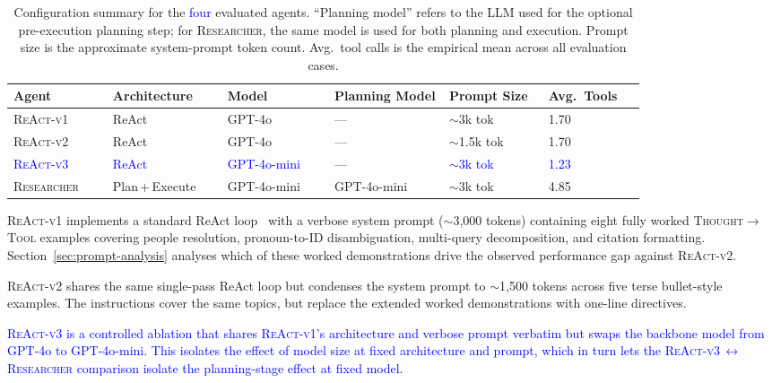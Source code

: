 \begin{table}[h]
\centering
\caption{Configuration summary for the \textcolor{blue}{four} evaluated agents.
``Planning model'' refers to the LLM used for the optional pre-execution planning step; for \textsc{Researcher}, the same model is used for both planning and execution.
Prompt size is the approximate system-prompt token count. Avg.\ tool calls is the empirical mean across all evaluation cases.}
\label{tab:agent_configs}
\small
\begin{tabular}{p{0.13\linewidth}p{0.15\linewidth}p{0.14\linewidth}p{0.15\linewidth}p{0.13\linewidth}p{0.12\linewidth}}
\toprule
\textbf{Agent} & \textbf{Architecture} & \textbf{Model} & \textbf{Planning Model} & \textbf{Prompt Size} & \textbf{Avg.\ Tools} \\
\midrule
\textsc{ReAct-v1}   & ReAct             & GPT-4o      & ---               & $\sim$3k tok   & 1.70 \\
\textsc{ReAct-v2}   & ReAct             & GPT-4o      & ---               & $\sim$1.5k tok & 1.70 \\
\textcolor{blue}{\textsc{ReAct-v3}}   & \textcolor{blue}{ReAct}             & \textcolor{blue}{GPT-4o-mini} & \textcolor{blue}{---}               & \textcolor{blue}{$\sim$3k tok}   & \textcolor{blue}{1.23} \\
\textsc{Researcher}  & Plan\,+\,Execute  & GPT-4o-mini & GPT-4o-mini       & $\sim$3k tok   & 4.85 \\
\bottomrule
\end{tabular}
\end{table}

\textsc{ReAct-v1} implements a standard ReAct loop~\cite{yao2022react} with a verbose system prompt ($\sim$3{,}000 tokens) containing eight fully worked \textsc{Thought}$\to$\textsc{Tool} examples covering people resolution, pronoun-to-ID disambiguation, multi-query decomposition, and citation formatting. Section~\ref{sec:prompt-analysis} analyses which of these worked demonstrations drive the observed performance gap against \textsc{ReAct-v2}.

\textsc{ReAct-v2} shares the same single-pass ReAct loop but condenses the system prompt to $\sim$1{,}500 tokens across five terse bullet-style examples. The instructions cover the same topics, but replace the extended worked demonstrations with one-line directives.

\textcolor{blue}{\textsc{ReAct-v3} is a controlled ablation that shares \textsc{ReAct-v1}'s architecture and verbose prompt verbatim but swaps the backbone model from GPT-4o to GPT-4o-mini. This isolates the effect of model size at fixed architecture and prompt, which in turn lets the \textsc{ReAct-v3}\,$\leftrightarrow$\,\textsc{Researcher} comparison isolate the planning-stage effect at fixed model.}

